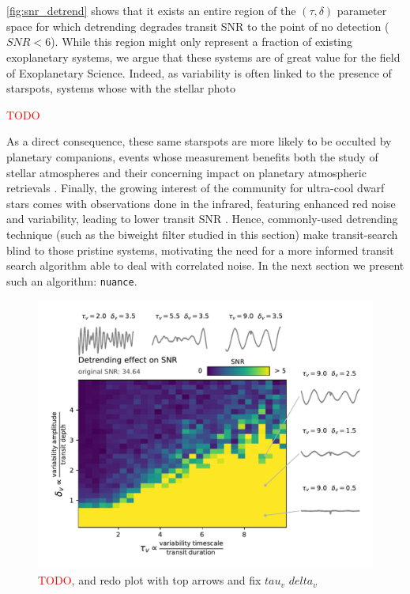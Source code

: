 \documentclass{aastex631}
\newcommand{\TODO}{\textcolor{red}{TODO}}
\begin{document}
\\\\
\autoref{fig:snr_detrend} shows that it exists an entire region of the $(\tau, \delta)$ parameter space for which detrending degrades transit SNR to the point of no detection ($SNR < 6$). While this region might only represent a fraction of existing exoplanetary systems, we argue that these systems are of great value for the field of Exoplanetary Science. Indeed, as variability is often linked to the presence of starspots, systems whose  with the stellar photo 


\TODO

As a direct consequence, these same starspots are more likely to be occulted by planetary companions, events whose measurement benefits both the study of stellar atmospheres and their concerning impact on planetary atmospheric retrievals \cite{}. Finally, the growing interest of the community for ultra-cool dwarf stars comes with observations done in the infrared, featuring enhanced red noise and variability, leading to lower transit SNR \cite{}. Hence, commonly-used detrending technique (such as the biweight filter studied in this section) make transit-search blind to those pristine systems, motivating the need for a more informed transit search algorithm able to deal with correlated noise. In the next section we present such an algorithm: \texttt{nuance}.

\begin{figure}[H]
    \begin{centering}
        \includegraphics[height=9cm]{../workflows/cleaning_snr/figures/simu1/result.pdf}
        \caption{\TODO{}, and redo plot with top arrows and fix $tau_v$ $delta_v$}
        \label{fig:snr_detrend}
    \end{centering}
\end{figure}
\end{document}
